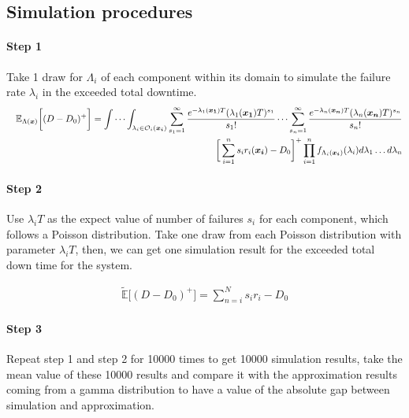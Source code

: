 \documentclass[preprint,12pt]{elsarticle}
\begin{document}
\subsection{Simulation procedures}
\paragraph{Step 1}

Take 1 draw for $\Lambda_{i}$ of each component within its domain to simulate the failure rate $\lambda_{i}$ in the exceeded total downtime.
\begin{eqnarray}
&& \mathbb{E}_{\Lambda(\boldsymbol{x})} \bigg[(D-D_0)^{+} \bigg]=
\idotsint_{\lambda_{i} \in \mathcal{O}_{i}(\boldsymbol{x_i})} \sum_{s_{1}=1}^{\infty}{ \frac{e^{-\lambda_{1}(\boldsymbol{x_{1}})T}(\lambda_{1}(\boldsymbol{x_{1}})T)^{s_{1}}}{s_{1}!}}\dots\sum_{s_{n}=1}^{\infty}{\frac{e^{-\lambda_{n}(\boldsymbol{x_{n}})T}(\lambda_{n}(\boldsymbol{x_{n}})T)^{s_{n}}}{s_{n}!}} \nonumber\\
 &&\bigg[\sum_{i=1}^{n}{s_{i}r_{i}(\boldsymbol{x_{i}})}-D_{0}\bigg]^{+}\prod_{i=1}^{n}{f_{\Lambda_{i}(\boldsymbol{x_{i}})}(\lambda_{i})d\lambda_{1}\dots d\lambda_{n}} \nonumber
\end{eqnarray}

\paragraph{Step 2}

Use $\lambda_{i}T$ as the expect value of number of failures $s_i$ for each component, which follows a Poisson distribution. Take one draw from each Poisson distribution with parameter $\lambda_{i}T$, then, we can get one simulation result for the exceeded total down time for the system.

\begin{eqnarray}
\tilde{\mathbb{E}}\bigg[(D-D_0)^{+} \bigg] =\sum_{n=i}^{N}{s_{i}r_{i}}-D_0
\end{eqnarray}


\paragraph{Step 3}

Repeat step 1 and step 2 for 10000  times to get 10000 simulation results, take the mean value of these 10000 results and compare it with the approximation results coming from a gamma distribution to have a value of the absolute gap between simulation and approximation.
\end{document}
